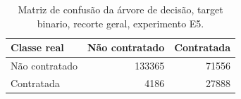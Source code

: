 \begin{table}
\caption{Matriz de confusão da árvore de decisão, target binario, recorte geral, experimento E5.}
\label{tab:matriz_confusao_treeClassification_binario_recorte_geral_holdout_80_20_e5}
\begin{tabular}{lrr}
\toprule
Classe real & Não contratado & Contratada \\
\midrule
Não contratado & 133365 & 71556 \\
Contratada & 4186 & 27888 \\
\bottomrule
\end{tabular}
\end{table}
